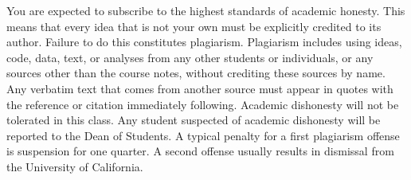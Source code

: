 \documentclass[10pt]{article}
\begin{document}
\begin{itemize}
  You are expected to subscribe to the highest standards of academic honesty. This means that every idea that is not your own must be explicitly credited to its author. Failure to do this constitutes plagiarism. Plagiarism includes using ideas, code, data, text, or analyses from any other students or individuals, or any sources other than the course notes, without crediting these sources by name. Any verbatim text that comes from another source must appear in quotes with the reference or citation immediately following. Academic dishonesty will not be tolerated in this class. Any student suspected of academic dishonesty will be reported to the Dean of Students. A typical penalty for a first plagiarism offense is suspension for one quarter. A second offense usually results in dismissal from the University of California.
  

\end{itemize}
\end{document}
